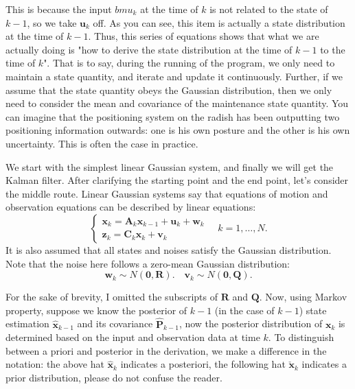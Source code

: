 This is because the input $bm{u}_k$ at the time of $k$ is not related to the state of $k-1$, so we take $\bm{u}_k$ off. As you can see, this item is actually a state distribution at the time of $k-1$. Thus, this series of equations shows that what we are actually doing is "how to derive the state distribution at the time of $k-1$ to the time of $k$". That is to say, during the running of the program, we only need to maintain a state quantity, and iterate and update it continuously. Further, if we assume that the state quantity obeys the Gaussian distribution, then we only need to consider the mean and covariance of the maintenance state quantity. You can imagine that the positioning system on the radish has been outputting two positioning information outwards: one is his own posture and the other is his own uncertainty. This is often the case in practice.

We start with the simplest linear Gaussian system, and finally we will get the Kalman filter. After clarifying the starting point and the end point, let's consider the middle route. Linear Gaussian systems say that equations of motion and observation equations can be described by linear equations:
\begin{equation}
\left\{ \begin{array}{l}
{\bm{x}_k} = \bm{A}_k {{\bm{x}_{k - 1}}+{\bm{u}_k}} + \bm{w}_k \\
{\bm{z}_{k}} = \bm{C}_k  { \bm{x}_k} + \bm{v}_{k} \end{array} \right. \quad k=1, \ldots, N .
\end{equation}
It is also assumed that all states and noises satisfy the Gaussian distribution. Note that the noise here follows a zero-mean Gaussian distribution:
\begin{equation}
\bm{w}_k \sim N(\bm{0}, \bm{R}). \quad \bm{v}_k \sim N( \bm{0}, \bm{Q}).
\end{equation}

For the sake of brevity, I omitted the subscripts of $\bm{R}$ and $\bm{Q}$. Now, using Markov property, suppose we know the posterior of $k-1$ (in the case of $k-1$) state estimation $\bm{\hat{x}}_{k-1} $ and its covariance $\bm{\hat{P}}_{k-1}$, now the posterior distribution of $\bm{x}_k$ is determined based on the input and observation data at time $k$. To distinguish between a priori and posterior in the derivation, we make a difference in the notation: the above hat $\bm{\hat{x}}_k$ indicates a posteriori, the following hat $\check{\bm{x}}_k $ indicates a prior distribution, please do not confuse the reader.

